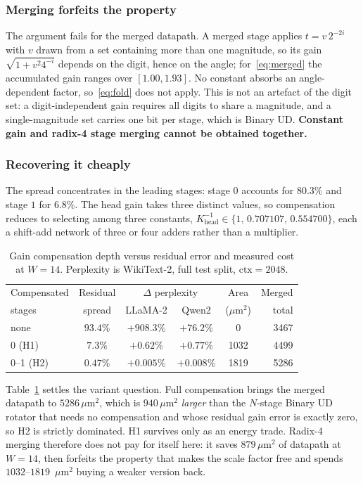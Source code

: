 \documentclass[conference]{IEEEtran}
\begin{document}
\subsubsection{Merging forfeits the property}
The argument fails for the merged datapath. A merged stage applies
$t = v\,2^{-2i}$ with $v$ drawn from a set containing more than one magnitude,
so its gain $\sqrt{1 + v^{2}4^{-i}}$ depends on the digit, hence on the angle;
for~\eqref{eq:merged} the accumulated gain ranges over $[1.00, 1.93]$. No
constant absorbs an angle-dependent factor, so~\eqref{eq:fold} does not apply.
This is not an artefact of the digit set: a digit-independent gain requires all
digits to share a magnitude, and a single-magnitude set carries one bit per
stage, which is Binary UD. \textbf{Constant gain and radix-4 stage merging
cannot be obtained together.}

\subsubsection{Recovering it cheaply}
The spread concentrates in the leading stages: stage $0$ accounts for
$80.3\%$ and stage $1$ for $6.8\%$. The head gain takes three distinct values,
so compensation reduces to selecting among three constants,
$K_{\text{head}}^{-1} \in \{1,\,0.707107,\,0.554700\}$, each a shift-add
network of three or four adders rather than a multiplier.

\begin{table}[t]
\caption{Gain compensation depth versus residual error and measured cost at
$W=14$. Perplexity is WikiText-2, full test split, $\mathrm{ctx}=2048$.}
\label{tab:gaincomp}
\centering
\begin{tabular}{lccccr}
\toprule
Compensated & Residual & \multicolumn{2}{c}{$\Delta$ perplexity} & Area & Merged \\
stages & spread & LLaMA-2 & Qwen2 & ($\mu$m$^2$) & total \\
\midrule
none      & $93.4\%$ & $+908.3\%$ & $+76.2\%$ & $0$    & 3467 \\
0 (H1)    & $7.3\%$  & $+0.62\%$  & $+0.77\%$ & 1032   & 4499 \\
0--1 (H2) & $0.47\%$ & $+0.005\%$ & $+0.008\%$& 1819   & 5286 \\
\bottomrule
\end{tabular}
\end{table}

Table~\ref{tab:gaincomp} settles the variant question. Full compensation brings
the merged datapath to $5286$\,$\mu$m$^2$, which is $940$\,$\mu$m$^2$
\emph{larger} than the $N$-stage Binary UD rotator that needs no compensation
and whose residual gain error is exactly zero, so H2 is strictly dominated. H1
survives only as an energy trade. Radix-4 merging therefore does not pay for
itself here: it saves $879$\,$\mu$m$^2$ of datapath at $W=14$, then forfeits
the property that makes the scale factor free and spends $1032$--$1819$\,
$\mu$m$^2$ buying a weaker version back.
\end{document}
